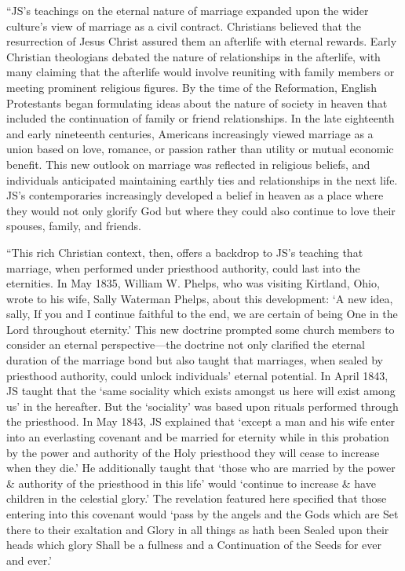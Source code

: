 			``JS's teachings on the eternal nature of marriage expanded upon the wider culture's view of marriage as a civil contract. Christians believed that the resurrection of Jesus Christ assured them an afterlife with eternal rewards. Early Christian theologians debated the nature of relationships in the afterlife, with many claiming that the afterlife would involve reuniting with family members or meeting prominent religious figures. By the time of the Reformation, English Protestants began formulating ideas about the nature of society in heaven that included the continuation of family or friend relationships. In the late eighteenth and early nineteenth centuries, Americans increasingly viewed marriage as a union based on love, romance, or passion rather than utility or mutual economic benefit. This new outlook on marriage was reflected in religious beliefs, and individuals anticipated maintaining earthly ties and relationships in the next life. JS's contemporaries increasingly developed a belief in heaven as a place where they would not only glorify God but where they could also continue to love their spouses, family, and friends.

			``This rich Christian context, then, offers a backdrop to JS's teaching that marriage, when performed under priesthood authority, could last into the eternities. In May 1835, William W. Phelps, who was visiting Kirtland, Ohio, wrote to his wife, Sally Waterman Phelps, about this development: `A new idea, sally, If you and I continue faithful to the end, we are certain of being One in the Lord throughout eternity.' This new doctrine prompted some church members to consider an eternal perspective---the doctrine not only clarified the eternal duration of the marriage bond but also taught that marriages, when sealed by priesthood authority, could unlock individuals' eternal potential. In April 1843, JS taught that the `same sociality which exists amongst us here will exist among us' in the hereafter. But the `sociality' was based upon rituals performed through the priesthood. In May 1843, JS explained that `except a man and his wife enter into an everlasting covenant and be married for eternity while in this probation by the power and authority of the Holy priesthood they will cease to increase when they die.' He additionally taught that `those who are married by the power \& authority of the priesthood in this life' would `continue to increase \& have children in the celestial glory.' The revelation featured here specified that those entering into this covenant would `pass by the angels and the Gods which are Set there to their exaltation and Glory in all things as hath been Sealed upon their heads which glory Shall be a fullness and a Continuation of the Seeds for ever and ever.'

